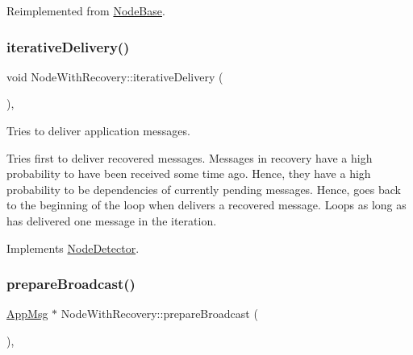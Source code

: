 Reimplemented from \hyperlink{class_node_base_add2450264be5dd616f9f9ac94e83b988}{Node\+Base}.

\mbox{\label{class_node_with_recovery_a9b61912f38b62452584dc80bf261ef4e}} 
\subsubsection{\texorpdfstring{iterative\+Delivery()}{iterativeDelivery()}}
{\footnotesize\ttfamily void Node\+With\+Recovery\+::iterative\+Delivery (\begin{DoxyParamCaption}{ }\end{DoxyParamCaption})\hspace{0.3cm}{\ttfamily [protected]}, {\ttfamily [virtual]}}



Tries to deliver application messages. 

Tries first to deliver recovered messages. Messages in recovery have a high probability to have been received some time ago. Hence, they have a high probability to be dependencies of currently pending messages. Hence, goes back to the beginning of the loop when delivers a recovered message. Loops as long as has delivered one message in the iteration. 

Implements \hyperlink{class_node_detector_a17ecf9939fce7471f4513b66185743cc}{Node\+Detector}.

\mbox{\label{class_node_with_recovery_a33d8e8775fd69cb647b38a54b36e1ebe}} 
\subsubsection{\texorpdfstring{prepare\+Broadcast()}{prepareBroadcast()}}
{\footnotesize\ttfamily \hyperlink{class_app_msg}{App\+Msg} $\ast$ Node\+With\+Recovery\+::prepare\+Broadcast (\begin{DoxyParamCaption}{ }\end{DoxyParamCaption})\hspace{0.3cm}{\ttfamily [protected]}, {\ttfamily [virtual]}}



